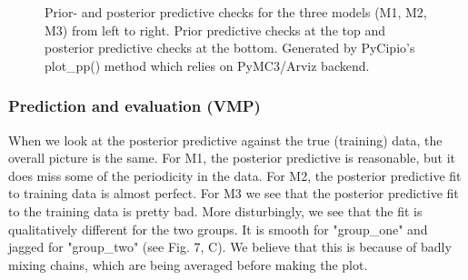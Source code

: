 \documentclass{article}
\begin{document}
\begin{figure}[H]
    \centering
    \quad
    \quad
    \caption{Prior- and posterior predictive checks for the three models (M1, M2, M3) from left to right. Prior predictive checks at the top and posterior predictive checks at the bottom. Generated by PyCipio's plot\_pp() method which relies on PyMC3/Arviz backend.}
\end{figure}

\subsubsection{Prediction and evaluation (VMP)}

\noindent When we look at the posterior predictive against the true (training) data, the overall picture is the same. For M1, the posterior predictive is reasonable, but it does miss some of the periodicity in the data. 
For M2, the posterior predictive fit to training data is almost perfect.
For M3 we see that the posterior predictive fit to the training data is pretty bad. 
More disturbingly, we see that the fit is qualitatively different for the two groups. 
It is smooth for "group\_one" and jagged for "group\_two" (see Fig. 7, C). We believe that this is because of badly mixing chains, 
which are being averaged before making the plot. 
\end{document}
